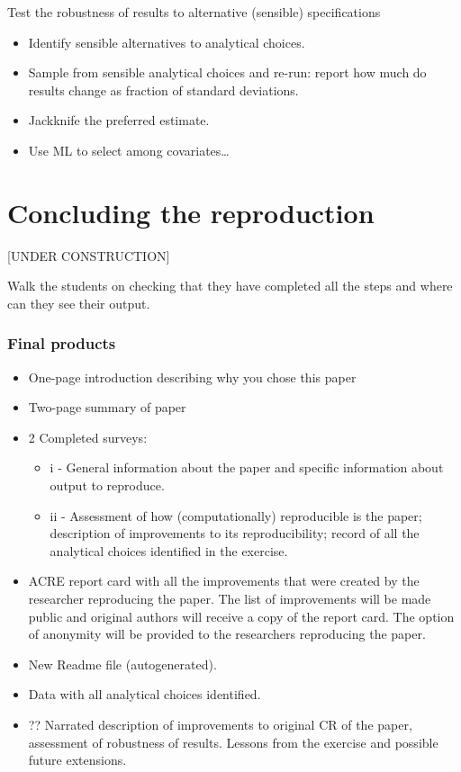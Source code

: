 \documentclass[]{book}
\providecommand{\tightlist}{%
  \setlength{\itemsep}{0pt}\setlength{\parskip}{0pt}}
\begin{document}
Test the robustness of results to alternative (sensible) specifications

\begin{itemize}
\tightlist
\item
  Identify sensible alternatives to analytical choices.
\item
  Sample from sensible analytical choices and re-run: report how much do results change as fraction of standard deviations.\\
\item
  Jackknife the preferred estimate.
\item
  Use ML to select among covariates\ldots{}
\end{itemize}

\hypertarget{concluding-the-reproduction}{%
\chapter{Concluding the reproduction}\label{concluding-the-reproduction}}

{[}UNDER CONSTRUCTION{]}

Walk the students on checking that they have completed all the steps and where can they see their output.

\hypertarget{final-products}{%
\subsection{Final products}\label{final-products}}

\begin{itemize}
\item
  One-page introduction describing why you chose this paper
\item
  Two-page summary of paper
\item
  2 Completed surveys:

  \begin{itemize}
  \tightlist
  \item
    i - General information about the paper and specific
    information about output to reproduce.\\
  \item
    ii - Assessment of how (computationally) reproducible is the paper;
    description of improvements to its reproducibility; record of all the
    analytical choices identified in the exercise.
  \end{itemize}
\item
  ACRE report card with all the improvements that were created by the researcher reproducing the paper. The list of improvements will be made public and original authors will receive a copy of the report card. The option of anonymity will be provided to the researchers reproducing the paper.
\item
  New Readme file (autogenerated).
\item
  Data with all analytical choices identified.
\item
  ?? Narrated description of improvements to original CR of the paper, assessment of robustness of results. Lessons from the exercise and possible future extensions.
\end{itemize}
\end{document}
